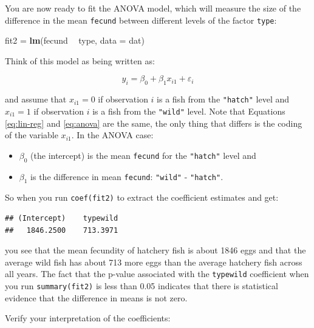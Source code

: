 \documentclass[]{book}
\newenvironment{Shaded}{\begin{snugshade}}{\end{snugshade}}
\newcommand{\DataTypeTok}[1]{\textcolor[rgb]{0.13,0.29,0.53}{#1}}
\newcommand{\KeywordTok}[1]{\textcolor[rgb]{0.13,0.29,0.53}{\textbf{#1}}}
\newcommand{\NormalTok}[1]{#1}
\newcommand{\OperatorTok}[1]{\textcolor[rgb]{0.81,0.36,0.00}{\textbf{#1}}}
\newcommand{\StringTok}[1]{\textcolor[rgb]{0.31,0.60,0.02}{#1}}
\providecommand{\tightlist}{%
  \setlength{\itemsep}{0pt}\setlength{\parskip}{0pt}}
\begin{document}
You are now ready to fit the ANOVA model, which will measure the size of the difference in the mean \texttt{fecund} between different levels of the factor \texttt{type}:

\begin{Shaded}
\begin{Highlighting}[]
\NormalTok{fit2 =}\StringTok{ }\KeywordTok{lm}\NormalTok{(fecund }\OperatorTok{~}\StringTok{ }\NormalTok{type, }\DataTypeTok{data =}\NormalTok{ dat)}
\end{Highlighting}
\end{Shaded}

Think of this model as being written as:

\begin{equation}
  y_i=\beta_0 + \beta_1 x_{i1} + \varepsilon_i
\label{eq:anova}
\end{equation}

and assume that \(x_{i1} = 0\) if observation \(i\) is a fish from the \texttt{"hatch"} level and \(x_{i1} = 1\) if observation \(i\) is a fish from the \texttt{"wild"} level. Note that Equations \eqref{eq:lin-reg} and \eqref{eq:anova} are the same, the only thing that differs is the coding of the variable \(x_{i1}\). In the ANOVA case:

\begin{itemize}
\tightlist
\item
  \(\beta_0\) (the intercept) is the mean \texttt{fecund} for the \texttt{"hatch"} level and
\item
  \(\beta_1\) is the difference in mean \texttt{fecund}: \texttt{"wild"} - \texttt{"hatch"}.
\end{itemize}

So when you run \texttt{coef(fit2)} to extract the coefficient estimates and get:

\begin{verbatim}
## (Intercept)    typewild 
##   1846.2500    713.3971
\end{verbatim}

you see that the mean fecundity of hatchery fish is about 1846 eggs and that the average wild fish has about 713 more eggs than the average hatchery fish across all years. The fact that the p-value associated with the \texttt{typewild} coefficient when you run \texttt{summary(fit2)} is less than 0.05 indicates that there is statistical evidence that the difference in means is not zero.

Verify your interpretation of the coefficients:
\end{document}
